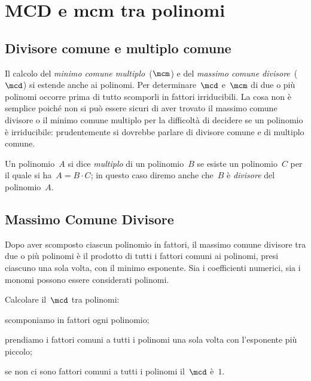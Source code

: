 
\chapter{MCD e mcm tra polinomi}

\section{Divisore comune e multiplo comune}

Il calcolo del \emph{minimo comune multiplo}~($\mcm$) e del \emph{massimo comune divisore}~($\mcd$) si estende anche ai polinomi.
Per determinare~$\mcd$ e~$\mcm$ di due o più polinomi occorre prima di tutto scomporli in fattori irriducibili.
La cosa non è semplice poiché non si può essere sicuri di aver trovato il massimo comune divisore o il minimo comune multiplo
per la difficoltà di decidere se un polinomio è irriducibile: prudentemente si dovrebbe parlare di divisore comune e di multiplo comune.

Un polinomio~$A$ si dice \emph{multiplo} di un polinomio~$B$ se esiste un polinomio~$C$ per il quale si ha~$A=B\cdot C$; in questo caso diremo
anche che~$B$ è \emph{divisore} del polinomio~$A$.

\section{Massimo Comune Divisore}
Dopo aver scomposto ciascun polinomio in fattori, il massimo comune divisore tra due o più polinomi è il prodotto di tutti i
fattori comuni ai polinomi, presi ciascuno una sola volta, con il minimo esponente.
Sia i coefficienti numerici, sia i monomi possono essere considerati polinomi.
\begin{procedura}
Calcolare il~$\mcd$ tra polinomi:
\begin{enumeratea}
\item scomponiamo in fattori ogni polinomio;
\item prendiamo i fattori comuni a tutti i polinomi una sola volta con l'esponente più piccolo;
\item se non ci sono fattori comuni a tutti i polinomi il~$\mcd$ è~$1$.
\end{enumeratea}
\end{procedura}

